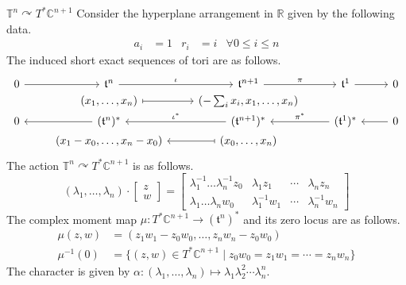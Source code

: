 \documentclass[b5paper]{article}
\newcommand{\acton}{\curvearrowright}
\begin{document}
\begin{example}{$\mathbb{T}^n \acton T^*\mathbb{C}^{n+1}$}
    Consider the hyperplane arrangement in $\mathbb{R}$ given by the following data.
    \begin{equation*}
        \begin{aligned}
            a_i &= 1 & r_i &= i & \forall 0 \leq i \leq n
        \end{aligned}
    \end{equation*}
    The induced short exact sequences of tori are as follows.
    \begin{equation*}
        \begin{tikzcd}[row sep=0ex]
            0 \arrow[r] & \mathfrak{t}^n \arrow[r, "\iota"] & \mathfrak{t}^{n+1} \arrow[r, "\pi"] & \mathfrak{t}^1 \arrow[r] & 0 \\
            {} & (x_1, \dots, x_n) \arrow[r, maps to] & (-\sum_i x_i, x_1, \dots, x_n) & {} & {} \\
            0 & (\mathfrak{t}^n)^* \arrow[l] & (\mathfrak{t}^{n+1})^* \arrow[l, "\iota^*"'] & (\mathfrak{t}^1)^* \arrow[l, "\pi^*"'] & 0 \arrow[l] \\
            {} & (x_1-x_0, \dots, x_n-x_0) & (x_0, \dots, x_n) \arrow[l, maps to] & {} & {}
        \end{tikzcd}
    \end{equation*}
    The action $\mathbb{T}^n \acton T^*\mathbb{C}^{n+1}$ is as follows.
    \begin{equation*}
        (\lambda_1, \dots, \lambda_n) \cdot
        \begin{bmatrix}
            z \\
            w
        \end{bmatrix}
        =
        \begin{bmatrix}
            \lambda_1^{-1} \dots \lambda_n^{-1} z_0 & \lambda_1z_1 & \cdots & \lambda_nz_n \\
            \lambda_1 \dots \lambda_n w_0 & \lambda_1^{-1}w_1 & \cdots & \lambda_n^{-1}w_n
        \end{bmatrix}
    \end{equation*}
    The complex moment map $\mu : T^*\mathbb{C}^{n+1} \to (\mathfrak{t}^n)^*$ and its zero locus are as follows.
    \begin{align*}
        \mu(z, w) &= (z_1w_1-z_0w_0, \dots, z_nw_n-z_0w_0) \\
        \mu^{-1}(0) &= \{ (z, w) \in T^*\mathbb{C}^{n+1} \mid z_0w_0 = z_1w_1 = \cdots = z_nw_n \}
    \end{align*}
    The character is given by $\alpha : (\lambda_1, \dots, \lambda_n) \mapsto \lambda_1 \lambda_2^2 \cdots \lambda_n^n$.


\end{example}
\end{document}
